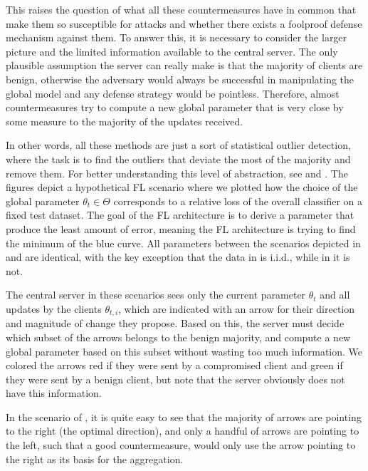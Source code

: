 \documentclass[conference]{IEEEtran}
\begin{document}
This raises the question of what all these countermeasures have in common that make them so susceptible for attacks and whether there exists a foolproof defense mechanism against them. To answer this, it is necessary to consider the larger picture and the limited information available to the central server. The only plausible assumption the server can really make is that the majority of clients are benign, otherwise the adversary would always be successful in manipulating the global model and any defense strategy would be pointless. Therefore, almost countermeasures try to compute a new global parameter that is very close by some measure to the majority of the updates received. 

In other words, all these methods are just a sort of statistical outlier detection, where the task is to find the outliers that deviate the most of the majority and remove them. For better understanding this level of abstraction, see  and . The figures depict a hypothetical FL scenario where we plotted how the choice of the global parameter $\theta_t \in \Theta$ corresponds to a relative loss of the overall classifier on a fixed test dataset. The goal of the FL architecture is to derive a parameter that produce the least amount of error, meaning the FL architecture is trying to find the minimum of the blue curve. All parameters between the scenarios depicted in  and  are identical, with the key exception that the data in  is i.i.d., while in  it is not.

The central server in these scenarios sees only the current parameter $\theta_t$ and all updates by the clients $\theta_{t,i}$, which are indicated with an arrow for their direction and magnitude of change they propose. Based on this, the server must decide which subset of the arrows belongs to the benign majority, and compute a new global parameter based on this subset without wasting too much information. We colored the arrows red if they were sent by a compromised client and green if they were sent by a benign client, but note that the server obviously does not have this information.

In the scenario of , it is quite easy to see that the majority of arrows are pointing to the right (the optimal direction), and only a handful of arrows are pointing to the left, such that a good countermeasure, would only use the arrow pointing to the right as its basis for the aggregation.
\end{document}
